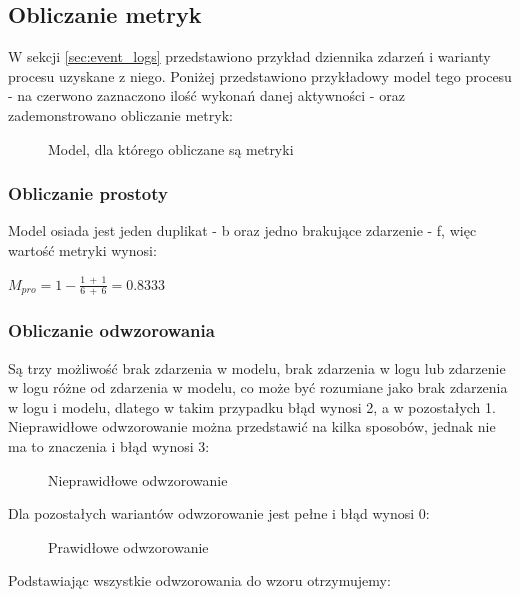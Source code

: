 \subsection{Obliczanie metryk}
W sekcji \ref{sec:event_logs} przedstawiono przykład dziennika zdarzeń i warianty procesu uzyskane z niego. Poniżej przedstawiono przykładowy model tego procesu - na czerwono zaznaczono ilość wykonań danej aktywności - oraz zademonstrowano obliczanie metryk:

\begin{figure}[h]
	\caption{\label{fig:metrics_business_process}Model, dla którego obliczane są metryki}
\end{figure}

\subsubsection{Obliczanie prostoty}
Model osiada jest jeden duplikat - b oraz jedno brakujące zdarzenie - f, więc wartość metryki wynosi:

$M_{pro} = 1 - \frac{1\ +\ 1}{6\ +\ 6} = 0.8333$

\subsubsection{Obliczanie odwzorowania}
\label{alignment-calculation}
Są trzy możliwość brak zdarzenia w modelu, brak zdarzenia w logu lub zdarzenie w logu różne od zdarzenia w modelu, co może być rozumiane jako brak zdarzenia w logu i modelu, dlatego w takim przypadku błąd wynosi 2, a w pozostałych 1. 
Nieprawidłowe odwzorowanie można przedstawić na kilka sposobów, jednak nie ma to znaczenia i błąd wynosi 3:
\begin{figure}[h]
	\caption{\label{fig:bad-alignment}Nieprawidłowe odwzorowanie}
\end{figure}
\newline Dla pozostałych wariantów odwzorowanie jest pełne i błąd wynosi 0:
\begin{figure}[h]
	\caption{\label{fig:good-alignment}Prawidłowe odwzorowanie}
\end{figure}
\newline Podstawiając wszystkie odwzorowania do wzoru otrzymujemy:

